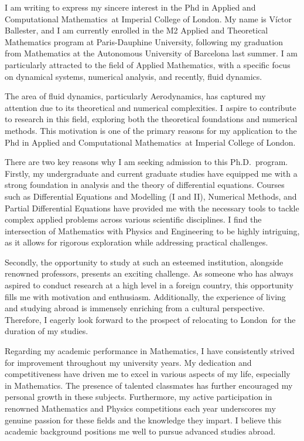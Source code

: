 \documentclass{letter}
\newcommand{\program}{Phd in Applied and Computational Mathematics}
\newcommand{\uni}{Imperial College of London}
\newcommand{\city}{London}
\begin{document}
\begin{letter}




  I am writing to express my sincere interest in the \program\ at \uni. My name is Víctor Ballester, and I am currently enrolled in the M2 Applied and Theoretical Mathematics program at Paris-Dauphine University, following my graduation from Mathematics at the Autonomous University of Barcelona last summer. I am particularly attracted to the field of Applied Mathematics, with a specific focus on dynamical systems, numerical analysis, and recently, fluid dynamics.

  The area of fluid dynamics, particularly Aerodynamics, has captured my attention due to its theoretical and numerical complexities. I aspire to contribute to research in this field, exploring both the theoretical foundations and numerical methods. This motivation is one of the primary reasons for my application to the \program\ at \uni.

  There are two key reasons why I am seeking admission to this Ph.D.\ program. Firstly, my undergraduate and current graduate studies have equipped me with a strong foundation in analysis and the theory of differential equations. Courses such as Differential Equations and Modelling (I and II), Numerical Methods, and Partial Differential Equations have provided me with the necessary tools to tackle complex applied problems across various scientific disciplines. I find the intersection of Mathematics with Physics and Engineering to be highly intriguing, as it allows for rigorous exploration while addressing practical challenges.

  Secondly, the opportunity to study at such an esteemed institution, alongside renowned professors, presents an exciting challenge. As someone who has always aspired to conduct research at a high level in a foreign country, this opportunity fills me with motivation and enthusiasm. Additionally, the experience of living and studying abroad is immensely enriching from a cultural perspective. Therefore, I eagerly look forward to the prospect of relocating to \city\ for the duration of my studies.

  Regarding my academic performance in Mathematics, I have consistently strived for improvement throughout my university years. My dedication and competitiveness have driven me to excel in various aspects of my life, especially in Mathematics. The presence of talented classmates has further encouraged my personal growth in these subjects. Furthermore, my active participation in renowned Mathematics and Physics competitions each year underscores my genuine passion for these fields and the knowledge they impart. I believe this academic background positions me well to pursue advanced studies abroad.


\end{letter}
\end{document}
